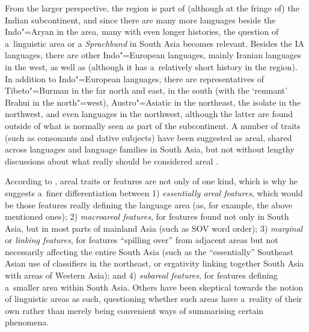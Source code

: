 From the larger perspective, the region is part of (although at the fringe of) the Indian subcontinent, and since there are many more languages beside the Indo"=Aryan in the area, many with even longer histories, the question of a~linguistic area or a \textit{Sprachbund} in South Asia becomes relevant. Besides the IA languages, there are other Indo"=European languages, mainly Iranian languages in the west, as well as \iliEnglish (although it has a~relatively short history in the region). In addition to Indo"=European languages, there are representatives of Tibeto"=Burman in the far north and east, \iliDravidian in the south (with the `remnant' Brahui in the north"=west), Austro"=Asiatic in the northeast, the isolate \iliBurushaski in the northwest, and even \iliTurkic languages in the northwest, although the latter are found outside of what is normally seen as part of the subcontinent. A number of traits (such as  consonants and dative subjects) have been suggested as areal, shared across languages and language families in South Asia, but not without lengthy discussions about what really should be considered areal \citep{emeneau1965,emeneau1980,masica1976,masica1991,masica2001,ebert2006}.


According to \citet{masica2001}, areal traits or features are not only of one kind, which is why he suggests a~finer differentiation between 1) \textit{essentially areal features}, which would be those features really defining the language area (as, for example, the above mentioned ones); 2) \textit{macroareal features}, for features found not only in South Asia, but in most parts of mainland Asia (such as SOV word order); 3) \textit{marginal} or \textit{linking features}, for features ``spilling over'' from adjacent areas but not necessarily affecting the entire South Asia (such as the ``essentially'' Southeast Asian use of  classifiers in the northeast, or ergativity linking together South Asia with areas of Western Asia); and 4) \textit{subareal features}, for features defining a~smaller area within South Asia. Others \citep{dahl2001,ktammwaelchli2001} have been skeptical towards the notion of linguistic areas as such, questioning whether such areas have a~reality of their own rather than merely being convenient ways of summarising certain phenomena. 


